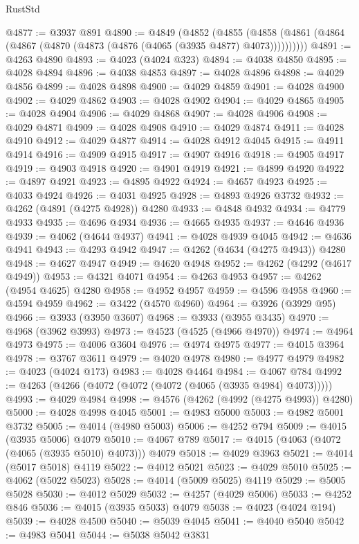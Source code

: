 \begin{lexlean}{RustStd}
\begin{coremodule}
@4877 := @3937 @891
@4890 := @4849
    (@4852
      (@4855 (@4858 (@4861 (@4864 (@4867 (@4870 (@4873 (@4876 (@4065 (@3935 @4877) @4073))))))))))
@4891 := @4263 @4890
@4893 := @4023 (@4024 @323)
@4894 := @4038 @4850
@4895 := @4028 @4894
@4896 := @4038 @4853
@4897 := @4028 @4896
@4898 := @4029 @4856
@4899 := @4028 @4898
@4900 := @4029 @4859
@4901 := @4028 @4900
@4902 := @4029 @4862
@4903 := @4028 @4902
@4904 := @4029 @4865
@4905 := @4028 @4904
@4906 := @4029 @4868
@4907 := @4028 @4906
@4908 := @4029 @4871
@4909 := @4028 @4908
@4910 := @4029 @4874
@4911 := @4028 @4910
@4912 := @4029 @4877
@4914 := @4028 @4912 @4045
@4915 := @4911 @4914
@4916 := @4909 @4915
@4917 := @4907 @4916
@4918 := @4905 @4917
@4919 := @4903 @4918
@4920 := @4901 @4919
@4921 := @4899 @4920
@4922 := @4897 @4921
@4923 := @4895 @4922
@4924 := @4657 @4923
@4925 := @4033 @4924
@4926 := @4031 @4925
@4928 := @4893 @4926 @3732
@4932 := @4262 (@4891 (@4275 @4928)) @4280
@4933 := @4848 @4932
@4934 := @4779 @4933
@4935 := @4696 @4934
@4936 := @4665 @4935
@4937 := @4646 @4936
@4939 := @4062 (@4644 @4937)
@4941 := @4028 @4939 @4045
@4942 := @4636 @4941
@4943 := @4293 @4942
@4947 := @4262 (@4634 (@4275 @4943)) @4280
@4948 := @4627 @4947
@4949 := @4620 @4948
@4952 := @4262 (@4292 (@4617 @4949))
@4953 := @4321 @4071
@4954 := @4263 @4953
@4957 := @4262 (@4954 @4625) @4280
@4958 := @4952 @4957
@4959 := @4596 @4958
@4960 := @4594 @4959
@4962 := @3422 (@4570 @4960)
@4964 := @3926 (@3929 @95)
@4966 := @3933 (@3950 @3607)
@4968 := @3933 (@3955 @3435)
@4970 := @4968 (@3962 @3993)
@4973 := @4523 (@4525 (@4966 @4970))
@4974 := @4964 @4973
@4975 := @4006 @3604
@4976 := @4974 @4975
@4977 := @4015 @3964
@4978 := @3767 @3611
@4979 := @4020 @4978
@4980 := @4977 @4979
@4982 := @4023 (@4024 @173)
@4983 := @4028 @4464
@4984 := @4067 @784
@4992 := @4263 (@4266 (@4072 (@4072 (@4072 (@4065 (@3935 @4984) @4073)))))
@4993 := @4029 @4984
@4998 := @4576 (@4262 (@4992 (@4275 @4993)) @4280)
@5000 := @4028 @4998 @4045
@5001 := @4983 @5000
@5003 := @4982 @5001 @3732
@5005 := @4014 (@4980 @5003)
@5006 := @4252 @794
@5009 := @4015 (@3935 @5006) @4079
@5010 := @4067 @789
@5017 := @4015 (@4063 (@4072 (@4065 (@3935 @5010) @4073))) @4079
@5018 := @4029 @3963
@5021 := @4014 (@5017 @5018) @4119
@5022 := @4012 @5021
@5023 := @4029 @5010
@5025 := @4062 (@5022 @5023)
@5028 := @4014 (@5009 @5025) @4119
@5029 := @5005 @5028
@5030 := @4012 @5029
@5032 := @4257 (@4029 @5006)
@5033 := @4252 @846
@5036 := @4015 (@3935 @5033) @4079
@5038 := @4023 (@4024 @194)
@5039 := @4028 @4500
@5040 := @5039 @4045
@5041 := @4040 @5040
@5042 := @4983 @5041
@5044 := @5038 @5042 @3831

\end{coremodule}
\end{lexlean}
